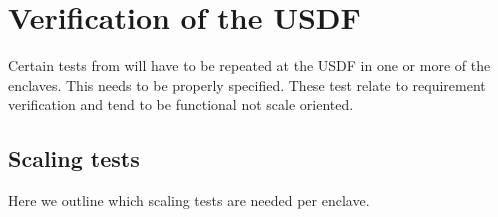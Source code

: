 \section{Verification of the \gls{USDF}} \label{sec:verification}


Certain tests from  will have to be repeated at the \gls{USDF} in one or more of the enclaves.
This needs to be properly specified. These test relate to requirement verification and tend to be functional not scale oriented.


\subsection{Scaling tests}
Here we outline which scaling tests are needed per enclave.
